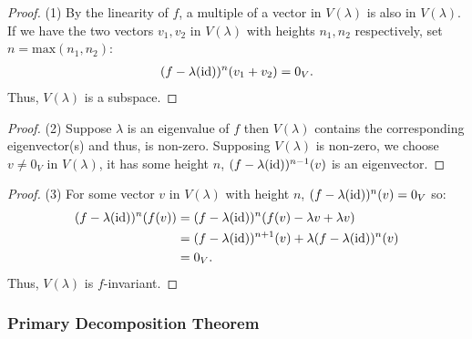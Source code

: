 \begin{proof}
    (1) By the linearity of $f$, a multiple of a vector in $V(\lambda)$
    is also in $V(\lambda)$. If we have the two vectors $v_1, v_2$ in
    $V(\lambda)$ with heights $n_1, n_2$ respectively, set
    $n = \text{max}(n_1, n_2)$: \begin{gather*}
        (f - \lambda(\operatorname{id}))^n(v_1 + v_2) = 0_V.
    \end{gather*} Thus, $V(\lambda)$ is a subspace.
\end{proof} \begin{proof}
    (2) Suppose $\lambda$ is an eigenvalue of $f$ then $V(\lambda)$ contains
    the corresponding eigenvector(s) and thus, is non-zero. Supposing
    $V(\lambda)$ is non-zero, we choose $v \neq 0_V$ in $V(\lambda)$,
    it has some height $n$, $(f - \lambda(\operatorname{id}))^{n - 1}(v)$
    is an eigenvector.
\end{proof} \begin{proof}
    (3) For some vector $v$ in $V(\lambda)$ with height $n$,
    $(f - \lambda(\operatorname{id}))^{n}(v) = 0_V$ so: \begin{align*}
        (f - \lambda(\operatorname{id}))^{n}(f(v)) 
        &= (f - \lambda(\operatorname{id}))^{n}(f(v) - \lambda v + \lambda v) \\
        &= (f - \lambda(\operatorname{id}))^{n + 1}(v) + \lambda (f - \lambda(\operatorname{id}))^{n}(v) \\
        &= 0_V.
    \end{align*} Thus, $V(\lambda)$ is $f$-invariant.
\end{proof} 

\subsubsection{Primary Decomposition Theorem}

